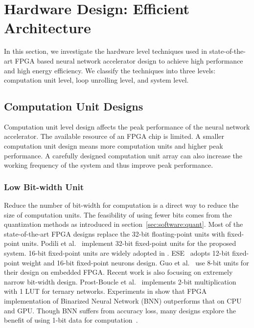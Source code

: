 \section{Hardware Design: Efficient Architecture}\label{sec:hardware}

In this section, we investigate the hardware level techniques used in state-of-the-art FPGA based neural network accelerator design to achieve high performance and high energy efficiency. We classify the techniques into three levels: computation unit level, loop unrolling level, and system level.

\subsection{Computation Unit Designs}\label{sec:hardware:cu}

Computation unit level design affects the peak performance of the neural network accelerator. The available resource of an FPGA chip is limited. A smaller computation unit design means more computation units and higher peak performance. A carefully designed computation unit array can also increase the working frequency of the system and thus improve peak performance.

\subsubsection{Low Bit-width Unit}\label{sec:hardware:cu:lbu}
Reduce the number of bit-width for computation is a direct way to reduce the size of computation units. The feasibility of using fewer bits comes from the quantization methods as introduced in section~\ref{sec:software:quant}. Most of the state-of-the-art FPGA designs replace the 32-bit floating-point units with fixed-point units. Podili et al.~\cite{podili2017fast} implement 32-bit fixed-point units for the proposed system. 16-bit fixed-point units are widely adopted in \cite{qiu2016going, li2016high, xiao2017exploring, guan2017fp, zhang2016caffeine}. ESE~\cite{han2017ese} adopts 12-bit fixed-point weight and 16-bit fixed-point neurons design. Guo et al.~\cite{guo2017angel} use 8-bit units for their design on embedded FPGA. Recent work is also focusing on extremely narrow bit-width design. Prost-Boucle et al.~\cite{prost2017scalable} implements 2-bit multiplication with 1 LUT for ternary networks. Experiments in \cite{nurvitadhi2016accelerating} show that FPGA implementation of Binarized Neural Network (BNN) outperforms that on CPU and GPU. Though BNN suffers from accuracy loss, many designs explore the benefit of using 1-bit data for computation~\cite{li20177, nakahara2017batch, zhao2017accelerating, umuroglu2017finn, nakahara2017fully, jiao2017accelerating, moss2017high, yang2018fully, ghasemzadehrebnet}.

